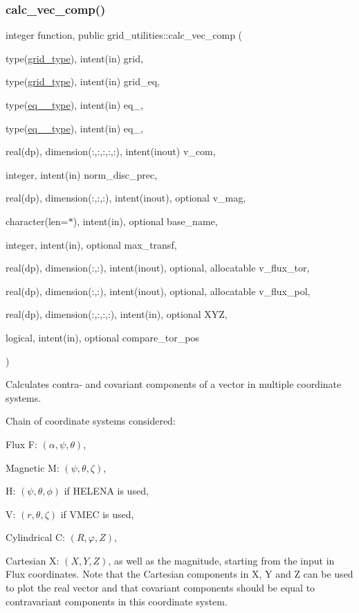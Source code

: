 \subsubsection{\texorpdfstring{calc\+\_\+vec\+\_\+comp()}{calc\_vec\_comp()}}
{\footnotesize\ttfamily integer function, public grid\+\_\+utilities\+::calc\+\_\+vec\+\_\+comp (\begin{DoxyParamCaption}\item[{type(\hyperlink{structgrid__vars_1_1grid__type}{grid\+\_\+type}), intent(in)}]{grid,  }\item[{type(\hyperlink{structgrid__vars_1_1grid__type}{grid\+\_\+type}), intent(in)}]{grid\+\_\+eq,  }\item[{type(\hyperlink{structeq__vars_1_1eq__1__type}{eq\+\_\+1\+\_\+type}), intent(in)}]{eq\+\_,  }\item[{type(\hyperlink{structeq__vars_1_1eq__2__type}{eq\+\_\+2\+\_\+type}), intent(in)}]{eq\+\_,  }\item[{real(dp), dimension(\+:,\+:,\+:,\+:,\+:), intent(inout)}]{v\+\_\+com,  }\item[{integer, intent(in)}]{norm\+\_\+disc\+\_\+prec,  }\item[{real(dp), dimension(\+:,\+:,\+:), intent(inout), optional}]{v\+\_\+mag,  }\item[{character(len=$\ast$), intent(in), optional}]{base\+\_\+name,  }\item[{integer, intent(in), optional}]{max\+\_\+transf,  }\item[{real(dp), dimension(\+:,\+:), intent(inout), optional, allocatable}]{v\+\_\+flux\+\_\+tor,  }\item[{real(dp), dimension(\+:,\+:), intent(inout), optional, allocatable}]{v\+\_\+flux\+\_\+pol,  }\item[{real(dp), dimension(\+:,\+:,\+:,\+:), intent(in), optional}]{X\+YZ,  }\item[{logical, intent(in), optional}]{compare\+\_\+tor\+\_\+pos }\end{DoxyParamCaption})}



Calculates contra-\/ and covariant components of a vector in multiple coordinate systems. 

Chain of coordinate systems considered\+:
\begin{DoxyEnumerate}
\item Flux F\+: $(\alpha,\psi,\theta)$,
\item Magnetic M\+: $(\psi,\theta,\zeta)$,
\begin{DoxyItemize}
\item H\+: $(\psi,\theta,\phi)$ if H\+E\+L\+E\+NA is used,
\item V\+: $(r,\theta,\zeta)$ if V\+M\+EC is used,
\end{DoxyItemize}
\item Cylindrical C\+: $(R,\varphi,Z)$,
\item Cartesian X\+: $(X,Y,Z)$, as well as the magnitude, starting from the input in Flux coordinates. Note that the Cartesian components in X, Y and Z can be used to plot the real vector and that covariant components should be equal to contravariant components in this coordinate system.
\end{DoxyEnumerate}

